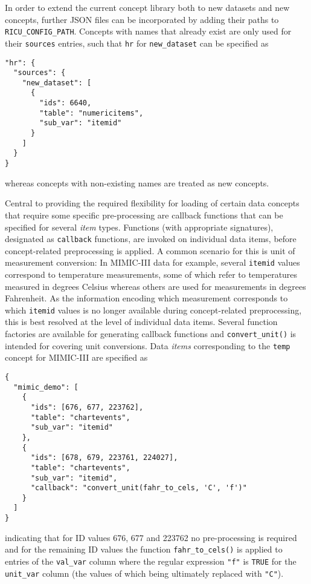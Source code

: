 \documentclass[
]{jss}
\begin{document}
In order to extend the current concept library both to new datasets and
new concepts, further JSON files can be incorporated by adding their
paths to \texttt{RICU\_CONFIG\_PATH}. Concepts with names that already
exist are only used for their \texttt{sources} entries, such that
\texttt{hr} for \texttt{new\_dataset} can be specified as

\begin{verbatim}
"hr": {
  "sources": {
    "new_dataset": [
      {
        "ids": 6640,
        "table": "numericitems",
        "sub_var": "itemid"
      }
    ]
  }
}
\end{verbatim}

whereas concepts with non-existing names are treated as new concepts.

Central to providing the required flexibility for loading of certain
data concepts that require some specific pre-processing are callback
functions that can be specified for several \emph{item} types. Functions
(with appropriate signatures), designated as \texttt{callback}
functions, are invoked on individual data items, before concept-related
preprocessing is applied. A common scenario for this is unit of
measurement conversion: In MIMIC-III data for example, several
\texttt{itemid} values correspond to temperature measurements, some of
which refer to temperatures measured in degrees Celsius whereas others
are used for measurements in degrees Fahrenheit. As the information
encoding which measurement corresponds to which \texttt{itemid} values
is no longer available during concept-related preprocessing, this is
best resolved at the level of individual data items. Several function
factories are available for generating callback functions and
\texttt{convert\_unit()} is intended for covering unit conversions. Data
\emph{items} corresponding to the \texttt{temp} concept for MIMIC-III
are specified as

\begin{verbatim}
{
  "mimic_demo": [
    {
      "ids": [676, 677, 223762],
      "table": "chartevents",
      "sub_var": "itemid"
    },
    {
      "ids": [678, 679, 223761, 224027],
      "table": "chartevents",
      "sub_var": "itemid",
      "callback": "convert_unit(fahr_to_cels, 'C', 'f')"
    }
  ]
}
\end{verbatim}

indicating that for ID values 676, 677 and 223762 no pre-processing is
required and for the remaining ID values the function
\texttt{fahr\_to\_cels()} is applied to entries of the \texttt{val\_var}
column where the regular expression \texttt{"f"} is \texttt{TRUE} for
the \texttt{unit\_var} column (the values of which being ultimately
replaced with \texttt{"C"}).
\end{document}
